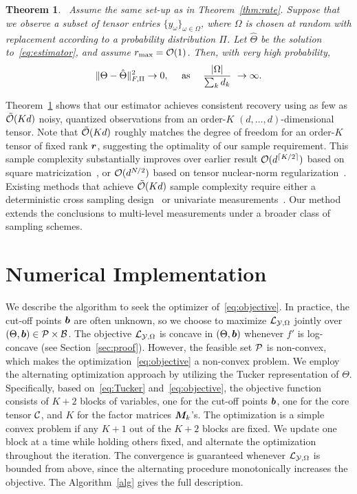 \documentclass[11pt]{article}
\theoremstyle{plain}
\newtheorem{thm}{Theorem}[section]
\theoremstyle{definition}
\begin{document}
\begin{thm}~\label{thm:completion}
Assume the same set-up as in Theorem~\ref{thm:rate}. Suppose that we observe a subset of tensor entries $\{y_\omega\}_{\omega\in\Omega}$, where $\Omega$ is chosen at random with replacement according to a probability distribution $\Pi$. Let $\hat \Theta$ be the solution to~\eqref{eq:estimator}, and assume $r_{\max}=\mathcal{O}(1)$. Then, with very high probability,
\[
\lVert\Theta-\hat \Theta\rVert_{F,\Pi}^2 \to 0,\quad \text{ as }\quad {|\Omega|\over \sum_k d_k} \ \to \infty.
\]
\end{thm}

Theorem~\ref{thm:completion} shows that our estimator achieves consistent recovery using as few as $\tilde{\mathcal{O}}(Kd)$ noisy, quantized observations from an order-$K$ $(d,\ldots,d)$-dimensional tensor. Note that $\tilde {\mathcal{O}}(Kd)$ roughly matches the degree of freedom for an order-$K$ tensor of fixed rank $\bm{r}$, suggesting the optimality of our sample requirement. This sample complexity substantially improves over earlier result $\mathcal{O}(d^{\lceil K/2\rceil})$ based on square matricization~\cite{mu2014square}, or $\mathcal{O}(d^{N/2})$ based on tensor nuclear-norm regularization~\cite{yuan2016tensor}. Existing methods that achieve $\tilde {\mathcal{O}}(Kd)$ sample complexity require either a deterministic cross sampling design~\cite{zhang2019cross} or univariate measurements~\cite{ghadermarzy2018learning}. Our method extends the conclusions to multi-level measurements under a broader class of sampling schemes.

\section{Numerical Implementation}\label{sec:algorithm}

We describe the algorithm to seek the optimizer of~\eqref{eq:objective}. In practice, the cut-off points $\bm{b}$ are often unknown, so we choose to maximize $\mathcal{L}_{\mathcal{Y},\Omega}$ jointly over $(\Theta,\bm{b})\in\mathcal{P}\times \mathcal{B}$. The objective $\mathcal{L}_{\mathcal{Y},\Omega}$ is concave in $(\Theta,\bm{b})$ whenever $f'$ is log-concave (see Section~\ref{sec:proof}). However, the feasible set $\mathcal{P}$ is non-convex, which makes the optimization~\eqref{eq:objective} a non-convex problem. We employ the alternating optimization approach by utilizing the Tucker representation of $\Theta$. Specifically, based on~\eqref{eq:Tucker} and~\eqref{eq:objective}, the objective function consists of $K+2$ blocks of variables, one for the cut-off points $\bm{b}$, one for the core tensor $\mathcal{C}$, and $K$ for the factor matrices $\bm M_k$'s. The optimization is a simple convex problem if any $K+1$ out of the $K+2$ blocks are fixed. We update one block at a time while holding others fixed, and alternate the optimization throughout the iteration. The convergence is guaranteed whenever $\mathcal{L}_{\mathcal{Y},\Omega}$ is bounded from above, since the alternating procedure monotonically increases the objective. The Algorithm~\ref{alg} gives the full description.
\end{document}

